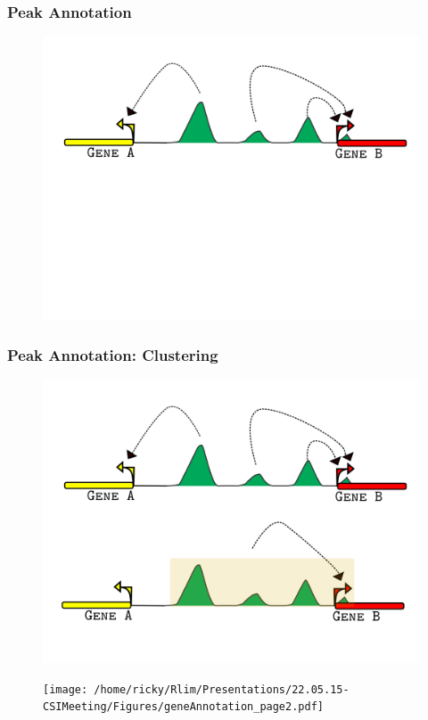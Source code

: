 \documentclass[notes]{beamer}
\begin{document}
\begin{frame}[plain]
    \frametitle{Peak Annotation}
    \begin{figure}
        \includegraphics[width=1\textwidth, height=0.6\textwidth]{../Images/peakConventional.png}
    \end{figure}
\end{frame}
\begin{frame}[plain]
    \frametitle{Peak Annotation: Clustering}
    \begin{figure}
        \includegraphics[width=1\textwidth, height=0.6\textwidth]{../Images/peakClustering.png}
    \end{figure}
\end{frame}

\begin{frame}[plain]
    \begin{figure}
        \texttt{[image: /home/ricky/Rlim/Presentations/22.05.15-CSIMeeting/Figures/geneAnnotation\_page2.pdf]}
    \end{figure}
\end{frame}
\end{document}

